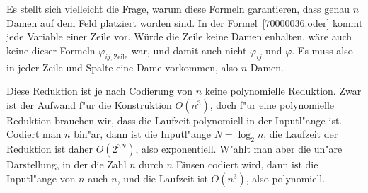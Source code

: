\begin{diskussion}
Es stellt sich vielleicht die Frage, warum diese Formeln garantieren, dass
genau $n$ Damen auf dem Feld platziert worden sind.
In der Formel~\eqref{70000036:oder} kommt jede Variable einer Zeile vor.
Würde die Zeile keine Damen enhalten, wäre auch keine dieser
Formeln $\varphi_{ij,\text{Zeile}}$ war, und damit auch nicht $\varphi_{ij}$
und $\varphi$.
Es muss also in jeder Zeile und Spalte eine Dame vorkommen, also $n$
Damen.

Diese Reduktion ist je nach Codierung von $n$ keine polynomielle Reduktion.
Zwar ist der Aufwand f"ur die Konstruktion $O(n^3)$, doch f"ur eine
polynomielle Reduktion brauchen wir, dass die Laufzeit polynomiell in
der Inputl"ange ist.
Codiert man $n$ bin"ar, dann ist die Inputl"ange $N=\log_2n$, die Laufzeit
der Reduktion ist daher $O(2^{3N})$, also exponentiell.
W"ahlt man aber die un"are Darstellung, in der die Zahl $n$ durch $n$ Einsen
codiert wird, dann ist die Inputl"ange von $n$ auch $n$, und die Laufzeit
ist $O(n^ 3)$, also polynomiell.
\end{diskussion}


